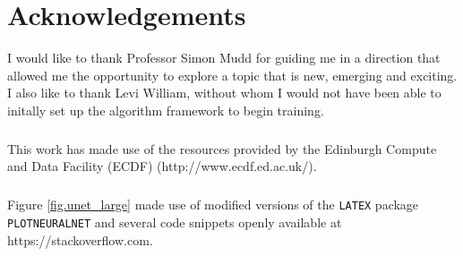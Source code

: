 \chapter*{Acknowledgements}

I would like to thank Professor Simon Mudd for guiding me in a direction that allowed me the opportunity to explore a topic that is new, emerging and exciting. I also like to thank Levi William, without whom I would not have been able to initally set up the algorithm framework to begin training.
\paragraph{}
This work has made use of the resources provided by the Edinburgh Compute and Data Facility (ECDF) (http://www.ecdf.ed.ac.uk/).
\paragraph{}
Figure \ref{fig.unet_large} made use of modified versions of the \texttt{LATEX} package \texttt{PLOTNEURALNET}
\citep{iqbal18} and several code snippets openly available at https://stackoverflow.com. 
